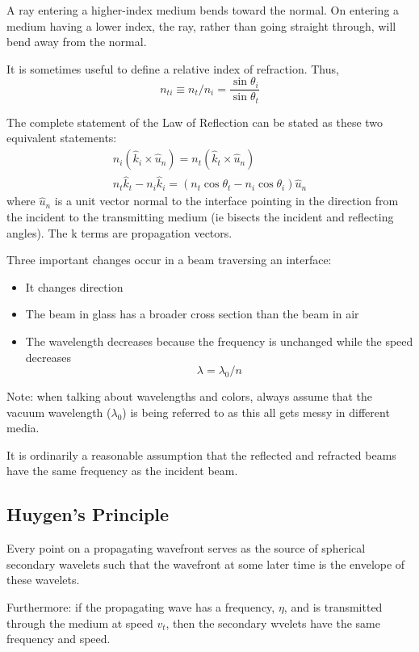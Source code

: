 \documentclass[12pt]{report}
\begin{document}
A ray entering a higher-index medium bends toward the normal. On entering a medium having a lower index, the ray, rather than going straight through, will bend away from the normal. 

It is sometimes useful to define a relative index of refraction. Thus, \[n_{ti} \equiv n_t/n_i = \frac{\sin\theta_i}{\sin\theta_t}\]

The complete statement of the Law of Reflection can be stated as these two equivalent statements:
\begin{equation}
\begin{array}{c}
n_i(\hat{k}_i \times \hat{u}_n) = n_t (\hat{k}_t \times \hat{u}_n) \\
n_t\hat{k}_t -n_i\hat{k}_i = (n_t\cos\theta_t - n_i\cos\theta_i) \hat{u}_n
\end{array}
\end{equation}
where $\hat{u}_n$ is a unit vector normal to the interface pointing in the direction from the incident to the transmitting medium (ie bisects the incident and reflecting angles). The k terms are propagation vectors. 

Three important changes occur in a beam traversing an interface:
\begin{itemize}
\item It changes direction
\item The beam in glass has a broader cross section than the beam in air
\item The wavelength decreases because the frequency is unchanged while the speed decreases \[\lambda = \lambda_0/n\]
\end{itemize}
Note: when talking about wavelengths and colors, always assume that the vacuum wavelength ($\lambda_0$) is being referred to as this all gets messy in different media. 

It is ordinarily a reasonable assumption that the reflected and refracted beams have the same frequency as the incident beam. 
\subsection{Huygen's Principle}
Every point on a propagating wavefront serves as the source of spherical secondary wavelets such that the wavefront at some later time is the envelope of these wavelets. 

Furthermore: if the propagating wave has a frequency, $\eta$, and is transmitted through the medium at speed $v_t$, then the secondary wvelets have the same frequency and speed. 
\end{document}
